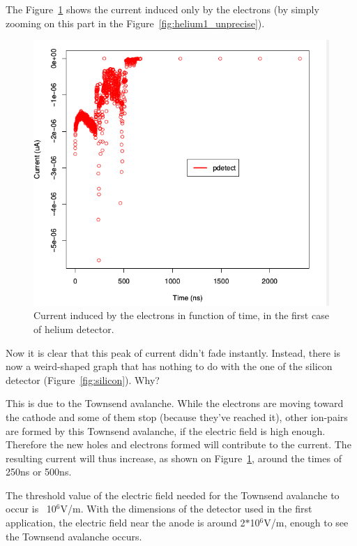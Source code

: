 \documentclass[11pt]{article}
\begin{document}
				The Figure~\ref{fig:helium1_precise} shows the current induced only by the electrons (by simply zooming
				on this part in the Figure~\ref{fig:helium1_unprecise}).

				\begin{figure}[H]
				  \center
				  \includegraphics[scale=0.5]{images/applications/helium1_precise.png}
				  \caption{Current induced by the electrons in function of time, in the first case of helium detector.}
				  \label{fig:helium1_precise}
				\end{figure}

				Now it is clear that this peak of current didn't fade instantly. Instead, there is now a weird-shaped
				graph that has nothing to do with the one of the silicon detector (Figure~\ref{fig:silicon}). Why?

				This is due to the Townsend avalanche. While the electrons are moving toward the cathode and some of them stop
				(because they've reached it), other ion-pairs are formed by this Townsend avalanche, if the electric field is
				high enough. Therefore the new holes and electrons formed will contribute to the current. The resulting current
				will thus increase, as shown on Figure~\ref{fig:helium1_precise}, around the times of 250ns or 500ns.

				The threshold value of the electric field needed for the Townsend avalanche to occur is ~10$^6$V/m. With the
				dimensions of the detector used in the first application, the electric field near the anode is around
				2$*$10$^6$V/m, enough to see the Townsend avalanche occurs.
\end{document}
